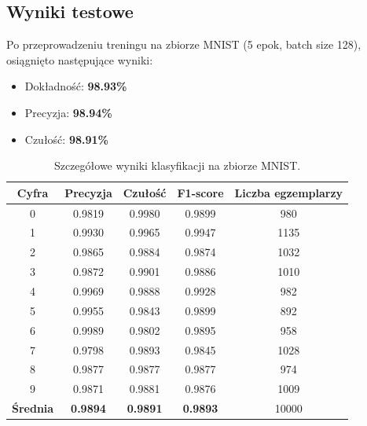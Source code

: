 \documentclass{article}
\begin{document}
\subsection{Wyniki testowe}
Po przeprowadzeniu treningu na zbiorze MNIST (5 epok, batch size 128), osiągnięto następujące wyniki:
\begin{itemize}
    \item Dokładność: \textbf{98.93\%}
    \item Precyzja: \textbf{98.94\%}
    \item Czułość: \textbf{98.91\%}
\end{itemize}

\begin{table}[H]
\centering
\begin{tabular}{|c|c|c|c|c|}
\hline
\textbf{Cyfra} & \textbf{Precyzja} & \textbf{Czułość} & \textbf{F1-score} & \textbf{Liczba egzemplarzy} \\ \hline
0              & 0.9819            & 0.9980           & 0.9899            & 980                    \\ \hline
1              & 0.9930            & 0.9965           & 0.9947            & 1135                   \\ \hline
2              & 0.9865            & 0.9884           & 0.9874            & 1032                   \\ \hline
3              & 0.9872            & 0.9901           & 0.9886            & 1010                   \\ \hline
4              & 0.9969            & 0.9888           & 0.9928            & 982                    \\ \hline
5              & 0.9955            & 0.9843           & 0.9899            & 892                    \\ \hline
6              & 0.9989            & 0.9802           & 0.9895            & 958                    \\ \hline
7              & 0.9798            & 0.9893           & 0.9845            & 1028                   \\ \hline
8              & 0.9877            & 0.9877           & 0.9877            & 974                    \\ \hline
9              & 0.9871            & 0.9881           & 0.9876            & 1009                   \\ \hline
\textbf{Średnia}  & \textbf{0.9894}   & \textbf{0.9891}  & \textbf{0.9893}   & 10000                  \\ \hline
\end{tabular}
\caption{Szczegółowe wyniki klasyfikacji na zbiorze MNIST.}
\end{table}
\end{document}
